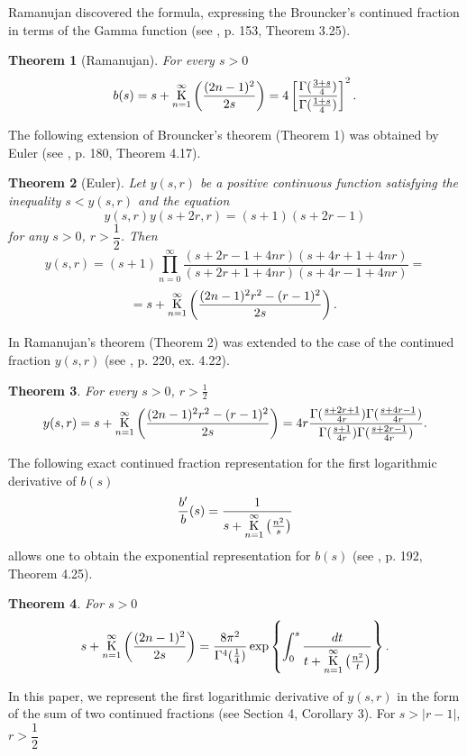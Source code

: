 \documentclass[a4paper,10pt]{article}      %
\newcommand{\K}{\operatornamewithlimits{K}}
\newtheorem{theorem}{Theorem}[section]
\begin{document}
 Ramanujan discovered the formula, expressing the Brouncker's continued fraction in terms of the Gamma function (see \cite{KHRB}, p. 153, Theorem 3.25).

\begin{theorem}[Ramanujan] For every $s > 0$
$$b(s) = s +  \K_{n=1}^\infty\left(\dfrac{(2n-1)^2}{2s}\right) =4\left[\dfrac{\Gamma(\frac{3+s}{4})}{\Gamma(\frac{1+s}{4})}\right]^2. $$
\end{theorem}

The following extension of Brouncker's theorem (Theorem 1) was obtained by Euler
(see \cite{KHRB}, p. 180, Theorem 4.17).

\begin{theorem}[Euler] Let $y(s,r)$ be a positive continuous function satisfying the inequality $s < y(s,r)$ and the equation
$$y(s,r)y(s+2r,r) = (s+1)(s+2r-1) $$ for any $s > 0$, $r > \dfrac{1}{2}$. Then
$$y(s,r) = (s+1) \prod_{n=0}^{\infty}\dfrac{(s+2r-1+4nr)(s+4r+1+4nr)}{(s+2r+1+4nr)(s+4r-1+4nr)} = $$ $$= s+ \K_{n=1}^\infty\left(\dfrac{(2n-1)^2r^2-(r-1)^2}{2s}\right). $$
\end{theorem}

In \cite{KHRB} Ramanujan's theorem (Theorem 2) was extended to the case of the continued fraction $y(s,r)$ (see \cite{KHRB}, p. 220, ex. 4.22).

\begin{theorem}
 For every $s > 0$, $r > \frac{1}{2}$
$$y(s,r) = s+ \K_{n=1}^\infty\left(\dfrac{(2n-1)^2r^2-(r-1)^2}{2s}\right) =4r\dfrac{\Gamma(\frac{s+2r+1}{4r})\Gamma(\frac{s+4r-1}{4r})}{\Gamma(\frac{s+1}{4r})\Gamma(\frac{s+2r-1}{4r})}.$$
\end{theorem}

The following exact continued fraction representation for the first logarithmic derivative of $b(s)$
$$\dfrac{b'}{b}(s) = \dfrac{1}{s+\K\limits_{n=1}^\infty \left( \frac{n^2}{s} \right)}$$
allows one to obtain the exponential representation for $b(s)$ (see \cite{KHRB}, p. 192, Theorem 4.25).

\begin{theorem} For $s > 0$
$$ s + \K_{n=1}^\infty\left(\dfrac{(2n-1)^2}{2s}\right) = \dfrac{8\pi^2}{\Gamma^4(\frac{1}{4})}\exp \left\{ \int_0^s \dfrac{dt}{t+\K\limits_{n=1}^\infty \left( \frac{n^2}{t} \right)} \right\}.$$
\end{theorem}

In this paper, we represent the first logarithmic derivative of $y(s,r)$ in the form of the sum of two continued fractions (see Section 4, Corollary 3). For $s > |r-1|$, $r > \dfrac{1}{2}$
\end{document}
